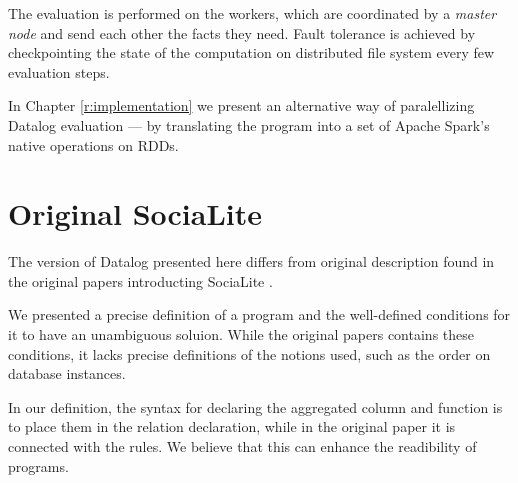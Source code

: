 The evaluation is performed on the workers, which are coordinated by a \emph{master node} and send each other the facts they need. Fault tolerance is achieved by checkpointing the state of the computation on distributed file system every few evaluation steps.

In Chapter \ref{r:implementation} we present an alternative way of paralellizing Datalog evaluation --- by translating the program into a set of Apache Spark's native operations on RDDs.


\section{Original SociaLite}

The version of Datalog presented here differs from original description found in the original papers introducting SociaLite \cite{socialite, distsoc}.

We presented a precise definition of a \datalogra program and the well-defined conditions for it to have an unambiguous soluion. While the original papers contains these conditions, it lacks precise definitions of the notions used, such as the order on database instances.

In our definition, the syntax for declaring the aggregated column and function is to place them in the relation declaration, while in the original paper it is connected with the rules. We believe that this can enhance the readibility of \datalogra programs.


